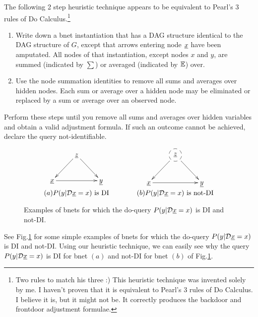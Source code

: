 The following 2 step heuristic technique appears to be equivalent to Pearl's 3 rules of Do Calculus.\footnote{Two rules to match his three :)  This heuristic technique was invented solely by me. I haven't proven that it is equivalent to Pearl's 
3 rules of Do Calculus. I believe it is,
but it might not be. It 
correctly produces the backdoor and frontdoor adjustment formulae.}

\begin{mdframed}[hidealllines=true,backgroundcolor=blue!10]

\begin{enumerate}
\item 
Write down a bnet instantiation
that has a DAG structure identical
to the DAG structure of $G$,
except that arrows entering node
$\rvx$ have been amputated.
All nodes  of that instantiation, except
nodes  $x$ and $y$,
are summed (indicated by $\sum$) or averaged
(indicated by ${ \mathbb{E}}$) over.



\item Use the node summation identities to
remove all sums and averages over hidden nodes.
Each sum or average over a hidden node may be 
eliminated or replaced by a sum or average over an observed node. 
\end{enumerate}
Perform these steps until you remove all sums and averages  over hidden variables 
and obtain a valid adjustment formula.
If such an outcome cannot be achieved,
declare the  query not-identifiable.

\end{mdframed}


\begin{figure}[h!]
$$
\begin{array}{ccc}
\xymatrix{
&\rvz\ar[ld]\ar[rd]
\\
\rvx\ar[rr]&&\rvy
}
&\quad\quad&
\xymatrix{
&*++[F-o]{\rvz}\ar[ld]\ar[rd]
\\
\rvx\ar[rr]&&\rvy
}
\\
(a) \text{$P(y|\cald\rvx=x)$ is DI}
&&(b) \text{$P(y|\cald\rvx=x)$ is not-DI}
\end{array}
$$
\caption{Examples of
bnets for which
the do-query $P(y|\cald\rvx=x)$
is
DI
and not-DI.
}
\label{fig-iden-noniden}
\end{figure}
See Fig.\ref{fig-iden-noniden}
for some simple
examples of
bnets for which
the do-query $P(y|\cald\rvx=x)$
is
DI
and not-DI.
Using our heuristic technique,
we can easily see why the
query $P(y|\cald\rvx=x)$
is DI
for bnet $(a)$ 
and not-DI for bnet $(b)$
of Fig.\ref{fig-iden-noniden}.

